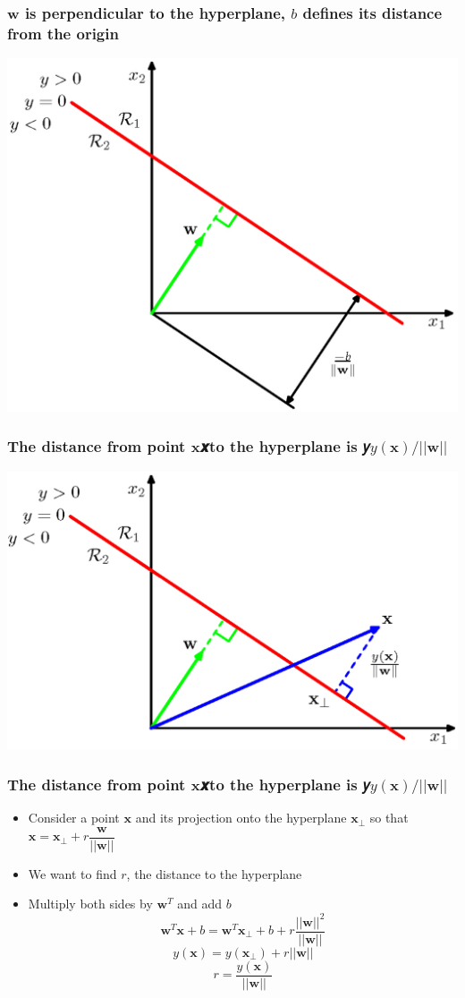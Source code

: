 \documentclass[12pt,notes,mathserif]{beamer}
\begin{document}
\begin{frame}[c]
	\frametitle{$\mathbf{w}$ is perpendicular to the hyperplane, $b$ defines its distance from the origin}
	\begin{center}
		\includegraphics[width=0.7\linewidth]{fig8/lec815.jpg}
	\end{center}
\end{frame}


\begin{frame}[c]
	\frametitle{The distance from point $\mathbf{x}$𝒙to the hyperplane is 𝑦$y(\mathbf{x})/||\mathbf{w}||$}
	\begin{center}
		\includegraphics[width=0.7\linewidth]{fig8/lec816.jpg}
	\end{center}
\end{frame}



\begin{frame}[c]
	\frametitle{The distance from point $\mathbf{x}$𝒙to the hyperplane is 𝑦$y(\mathbf{x})/||\mathbf{w}||$}
	\begin{itemize}
		\item Consider a point $\mathbf{x}$ and its projection onto the hyperplane $\mathbf{x}_{\bot}$ so that $\mathbf{x}=\mathbf{x}_{\bot}+r\dfrac{\mathbf{w}}{||\mathbf{w}||}$
		\item We want to find $r$, the distance to the hyperplane
		\item Multiply both sides by $\mathbf{w}^T$ and add $b$
		      \[
			      \mathbf{w}^T\mathbf{x}+b=
			      \mathbf{w}^T\mathbf{x}_{\bot} +b+r\dfrac{||\mathbf{w}||^2}{||\mathbf{w}||}
		      \]
		      \[
			      y(\mathbf{x})=y(\mathbf{x}_{\bot})+r||\mathbf{w}||
		      \]
		      \[
			      r=\dfrac{y(\mathbf{x})}{||\mathbf{w}||}
		      \]
	\end{itemize}
\end{frame}
\end{document}
